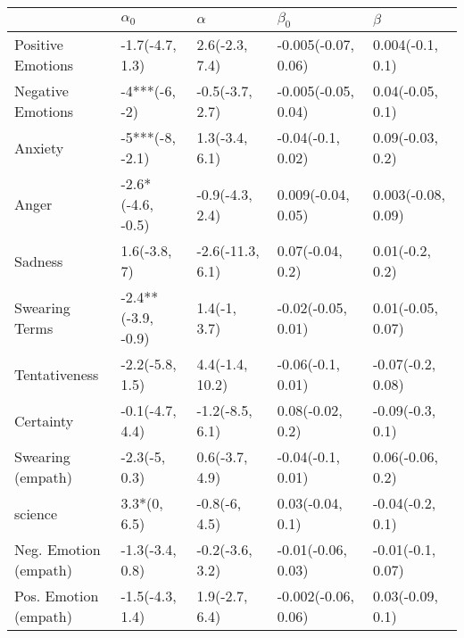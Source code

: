 \begin{tabular}{lllll}
\toprule
{} &          $\alpha_0$ &          $\alpha$ &            $\beta_0$ &             $\beta$ \\
\midrule
Positive Emotions     &     -1.7(-4.7, 1.3) &    2.6(-2.3, 7.4) &  -0.005(-0.07, 0.06) &    0.004(-0.1, 0.1) \\
Negative Emotions     &       -4***(-6, -2) &   -0.5(-3.7, 2.7) &  -0.005(-0.05, 0.04) &    0.04(-0.05, 0.1) \\
Anxiety               &     -5***(-8, -2.1) &    1.3(-3.4, 6.1) &    -0.04(-0.1, 0.02) &    0.09(-0.03, 0.2) \\
Anger                 &   -2.6*(-4.6, -0.5) &   -0.9(-4.3, 2.4) &   0.009(-0.04, 0.05) &  0.003(-0.08, 0.09) \\
Sadness               &        1.6(-3.8, 7) &  -2.6(-11.3, 6.1) &     0.07(-0.04, 0.2) &     0.01(-0.2, 0.2) \\
Swearing Terms        &  -2.4**(-3.9, -0.9) &      1.4(-1, 3.7) &   -0.02(-0.05, 0.01) &   0.01(-0.05, 0.07) \\
Tentativeness         &     -2.2(-5.8, 1.5) &   4.4(-1.4, 10.2) &    -0.06(-0.1, 0.01) &   -0.07(-0.2, 0.08) \\
Certainty             &     -0.1(-4.7, 4.4) &   -1.2(-8.5, 6.1) &     0.08(-0.02, 0.2) &    -0.09(-0.3, 0.1) \\
Swearing (empath)     &       -2.3(-5, 0.3) &    0.6(-3.7, 4.9) &    -0.04(-0.1, 0.01) &    0.06(-0.06, 0.2) \\
science               &        3.3*(0, 6.5) &     -0.8(-6, 4.5) &     0.03(-0.04, 0.1) &    -0.04(-0.2, 0.1) \\
Neg. Emotion (empath) &     -1.3(-3.4, 0.8) &   -0.2(-3.6, 3.2) &   -0.01(-0.06, 0.03) &   -0.01(-0.1, 0.07) \\
Pos. Emotion (empath) &     -1.5(-4.3, 1.4) &    1.9(-2.7, 6.4) &  -0.002(-0.06, 0.06) &    0.03(-0.09, 0.1) \\
\bottomrule
\end{tabular}
